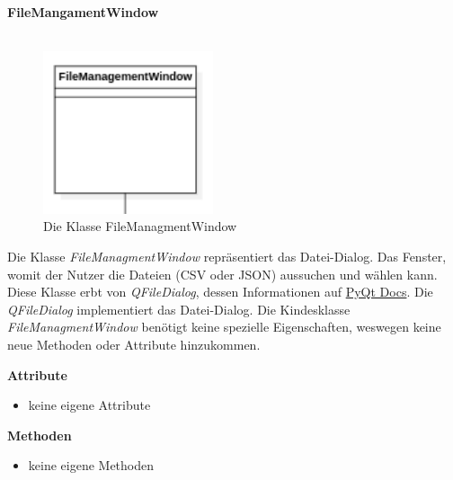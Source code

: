 \documentclass{article}
\begin{document}
\newpage
\textbf{\large{FileMangamentWindow}}\\\\
\begin{figure}[H]%
    \centering
    \includegraphics[width=5cm]{entwurf/Entwurf_dokument/img/Alissa/FileManagmentWindow.png}
    \caption{Die Klasse FileManagmentWindow}
\end{figure}
Die Klasse \textit{FileManagmentWindow} repräsentiert das Datei-Dialog. Das Fenster, womit der Nutzer die Dateien (CSV oder JSON) aussuchen und wählen kann. Diese Klasse erbt von \textit{QFileDialog}, dessen Informationen auf \href{https://doc.qt.io/qtforpython-5/PySide2/QtWidgets/QFileDialog.html}{PyQt Docs}. Die \textit{QFileDialog} implementiert das Datei-Dialog. Die Kindesklasse \textit{FileManagmentWindow} benötigt keine spezielle Eigenschaften, weswegen keine neue Methoden oder Attribute hinzukommen.
\newline \newline

\textbf{{Attribute}}
\begin{itemize}
\item[] keine eigene Attribute
\end{itemize}

\textbf{{Methoden}}
\begin{itemize}
\item[] keine eigene Methoden
\end{itemize}
\end{document}
